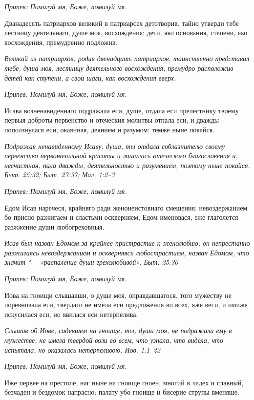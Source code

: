 \itshape Припев:\normalfont{} Помилуй мя, Боже, помилуй мя.


Дванадесять патриархов великий в патриарсех детотворив, тайно утверди тебе лествицу деятельнаго, душе моя, восхождения: дети, яко основания, степени, яко восхождения, премудренно подложив.


\itshape Великий из патриархов, родив двенадцать патриархов, таинственно представил тебе, душа моя, лестницу деятельного восхождения, премудро расположив детей как ступени, а свои шаги, как восхождения вверх.\normalfont{}


\itshape Припев:\normalfont{} Помилуй мя, Боже, помилуй мя.


Исава возненавиденнаго подражала еси, душе, отдала еси прелестнику твоему первыя доброты первенство и отеческия молитвы отпала еси, и дважды поползнулася еси, окаянная, деянием и разумом: темже ныне покайся.


\itshape Подражая ненавиденному Исаву, душа, ты отдала соблазнителю своему первенство первоначальной красоты и лишилась отеческого благословения и, несчастная, пала дважды, деятельностью и разумением, поэтому ныне покайся. Быт. 25:32; Быт. 27:37; Мал. 1:2–3\normalfont{}


\itshape Припев:\normalfont{} Помилуй мя, Боже, помилуй мя.


Едом Исав наречеся, крайняго ради женонеистовнаго смешения: невоздержанием бо присно разжигаем и сластьми оскверняем, Едом именовася, еже глаголется разжжение души любогреховныя.


\itshape Исав был назван Едомом за крайнее пристрастие к женолюбию; он непрестанно разжигаясь невоздержанием и оскверняясь любострастием, назван Едомом, что значит "--- «распаление души грехолюбивой». Быт. 25:30\normalfont{}


\itshape Припев:\normalfont{} Помилуй мя, Боже, помилуй мя.


Иова на гноищи слышавши, о душе моя, оправдавшагося, того мужеству не поревновала еси, твердаго не имела еси предложения во всех, яже веси, и имиже искусилася еси, но явилася еси нетерпелива.


\itshape Слышав об Иове, сидевшем на гноище, ты, душа моя, не подражала ему в мужестве, не имела твердой воли во всем, что узнала, что видела, что испытала, но оказалась нетерпеливою. Иов. 1:1–22\normalfont{}


\itshape Припев:\normalfont{} Помилуй мя, Боже, помилуй мя.


Иже первее на престоле, наг ныне на гноище гноен, многий в чадех и славный, безчаден и бездомок напрасно: палату убо гноище и бисерие струпы вменяше.


